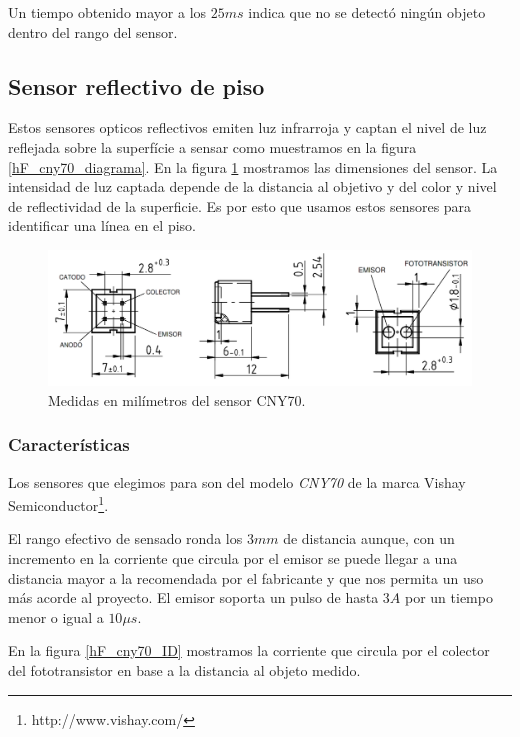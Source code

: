 Un tiempo obtenido mayor a los $25ms$ indica que no se detect\'o ning\'un objeto dentro del rango del sensor.

\subsection{Sensor reflectivo de piso}
\label{h_sensado_piso}

Estos sensores opticos reflectivos emiten luz infrarroja y captan el nivel de luz reflejada sobre la superf\'icie a sensar como muestramos
en la figura \ref{hF_cny70_diagrama}.
En la figura \ref{hF_cny70_dim} mostramos las dimensiones del sensor.
La intensidad de luz captada depende de la distancia al objetivo y del color y nivel de reflectividad de la superficie.
Es por esto que usamos estos sensores para identificar una l\'inea en el piso.

\begin{figure}[ht]
	\centering
	\includegraphics[scale=0.25]{cny70_dim.png}
	\caption{Medidas en mil\'imetros del sensor CNY70.}
	\label{hF_cny70_dim}
\end{figure}

\subsubsection{Caracter\'isticas}
\label{h_sensado_piso_caracteristicas}

Los sensores que elegimos para son del modelo \emph{CNY70} de la marca Vishay Semiconductor\footnote{http://www.vishay.com/}.

El rango efectivo de sensado ronda los $3 mm$ de distancia aunque, con un incremento en la corriente que circula por el emisor
se puede llegar a una distancia mayor a la recomendada por el fabricante y que nos permita un uso m\'as acorde al proyecto.
El emisor soporta un pulso de hasta $3 A$ por un tiempo menor o igual a $10\mu s$.

En la figura \ref{hF_cny70_ID} mostramos la corriente que circula por el colector del fototransistor en base a la distancia al objeto medido.

